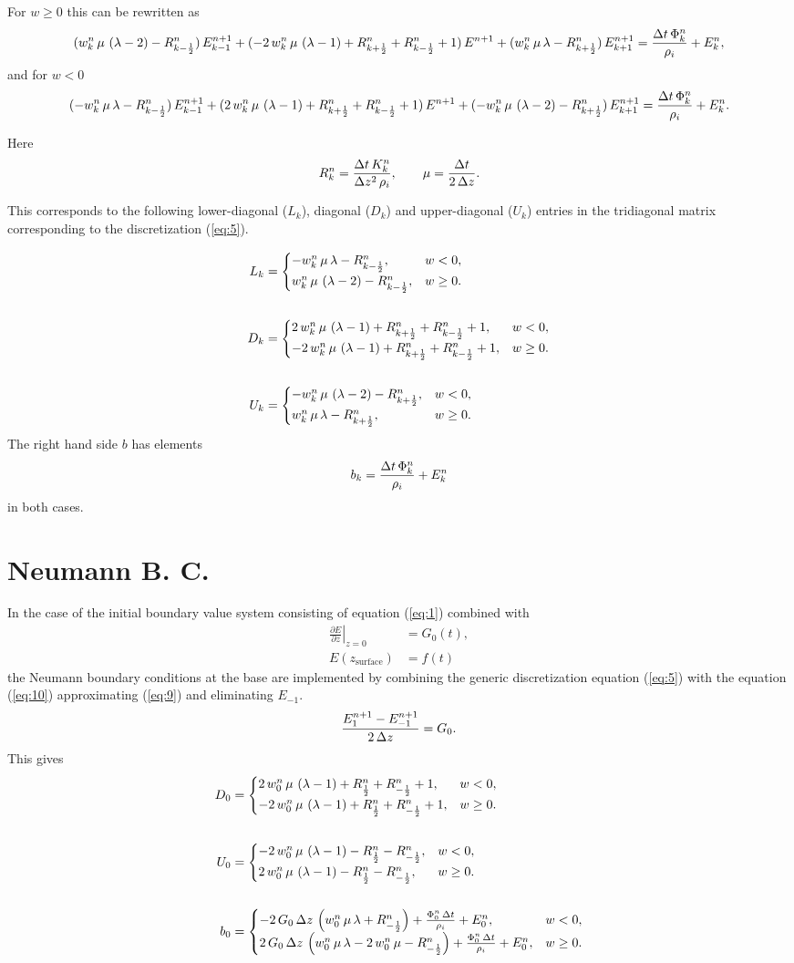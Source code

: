 \documentclass{article}
\begin{document}
For $w \ge 0$ this can be rewritten as
\begin{equation}
  \label{eq:6}
  (w^{n}_{k}\,\mu\,\left(\lambda-2\right)-R^{n}_{k-\frac{1}{2}})\, E^{n+1}_{k-1} + (-2\,w^{n}_{k}\,\mu\,\left(\lambda-1\right)+R^{n}_{k+\frac{1}{2}}+R^{n}_{k-\frac{1}{2}}+1)\, E^{n+1} + (w^{n}_{k}\,\mu\,\lambda-R^{n}_{k+\frac{1}{2}})\, E^{n+1}_{k+1} = \frac{\Delta t\,\Phi^{n}_{k}}{\rho_{i}}+E^{n}_{k},
\end{equation}
and for $w < 0$
\begin{equation}
  \label{eq:7}
  (-w^{n}_{k}\,\mu\,\lambda-R^{n}_{k-\frac{1}{2}})\, E^{n+1}_{k-1} + (2\,w^{n}_{k}\,\mu\,\left(\lambda-1\right)+R^{n}_{k+\frac{1}{2}}+R^{n}_{k-\frac{1}{2}}+1)\, E^{n+1} + (-w^{n}_{k}\,\mu\,\left(\lambda-2\right)-R^{n}_{k+\frac{1}{2}})\, E^{n+1}_{k+1} = \frac{\Delta t\,\Phi^{n}_{k}}{\rho_{i}}+E^{n}_{k}.
\end{equation}

Here
\begin{equation}
  R^{n}_{k} = \frac{\Delta t\,K^{n}_{k}}{\Delta z^2\,\rho_{i}},\quad\quad \mu = \frac{\Delta t}{2\,\Delta z}.
\end{equation}

This corresponds to the following lower-diagonal ($L_{k}$), diagonal
($D_{k}$) and upper-diagonal ($U_{k}$) entries in the tridiagonal
matrix corresponding to the discretization (\ref{eq:5}).

\newcommand{\wcases}[3]{#1 &= \begin{cases} #2, & w < 0,\\#3, & w \ge 0.\end{cases}}

\begin{align}
  \wcases{L_{k}}{\Lm}{\Lp}\\
  \notag\\
  \wcases{D_{k}}{\Dm}{\Dp}\\
  \notag\\
  \wcases{U_{k}}{\Um}{\Up}
\end{align}
The right hand side $b$ has elements
\begin{equation}
  \label{eq:8}
  b_{k} = \frac{\Delta t\,\Phi^{n}_{k}}{\rho_{i}}+E^{n}_{k}
\end{equation}
in both cases.

\section{Neumann B. C.}
\label{sec:neumann-b-c}

In the case of the initial boundary value system consisting of
equation (\ref{eq:1}) combined with
\begin{align}
  \label{eq:9}
  \left.\frac{\partial E}{\partial z}\right|_{z = 0} &= G_{0}(t),\\
  E(z_{\text{surface}}) &= f(t)
\end{align}
the Neumann boundary conditions at the base are implemented by
combining the generic discretization equation (\ref{eq:5}) with the
equation (\ref{eq:10}) approximating (\ref{eq:9}) and eliminating
$E_{-1}$.
\begin{equation}
  \label{eq:10}
  \frac{E^{n+1}_{1}-E^{n+1}_{-1}}{2\,\Delta z}=G_{0}.
\end{equation}
This gives
\begin{align}
  \wcases{D_{0}}{\Dmb}{\Dpb}\\
  \notag\\
  \wcases{U_{0}}{\Umb}{\Upb}\\
  \notag\\
  \wcases{b_{0}}{\Bmb}{\Bpb}
\end{align}
\end{document}
